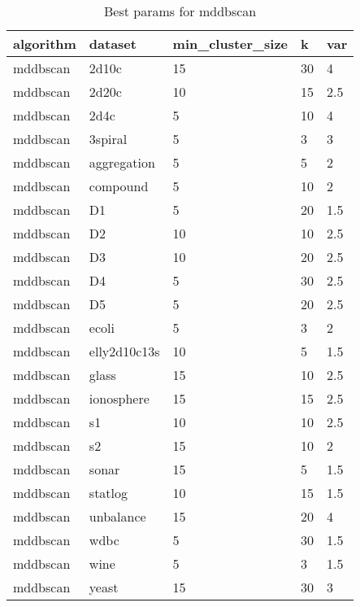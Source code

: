 \begin{table}[H]
\centering
\caption{Best params for mddbscan}
\label{tab:params:mddbscan}
\begin{tabular}{|l|l|l|l|l|}
\hline
algorithm & dataset & min\_cluster\_size & k & var \\
\hline
mddbscan & 2d10c & 15 & 30 & 4 \\
\hline
mddbscan & 2d20c & 10 & 15 & 2.5 \\
\hline
mddbscan & 2d4c & 5 & 10 & 4 \\
\hline
mddbscan & 3spiral & 5 & 3 & 3 \\
\hline
mddbscan & aggregation & 5 & 5 & 2 \\
\hline
mddbscan & compound & 5 & 10 & 2 \\
\hline
mddbscan & D1 & 5 & 20 & 1.5 \\
\hline
mddbscan & D2 & 10 & 10 & 2.5 \\
\hline
mddbscan & D3 & 10 & 20 & 2.5 \\
\hline
mddbscan & D4 & 5 & 30 & 2.5 \\
\hline
mddbscan & D5 & 5 & 20 & 2.5 \\
\hline
mddbscan & ecoli & 5 & 3 & 2 \\
\hline
mddbscan & elly2d10c13s & 10 & 5 & 1.5 \\
\hline
mddbscan & glass & 15 & 10 & 2.5 \\
\hline
mddbscan & ionosphere & 15 & 15 & 2.5 \\
\hline
mddbscan & s1 & 10 & 10 & 2.5 \\
\hline
mddbscan & s2 & 15 & 10 & 2 \\
\hline
mddbscan & sonar & 15 & 5 & 1.5 \\
\hline
mddbscan & statlog & 10 & 15 & 1.5 \\
\hline
mddbscan & unbalance & 15 & 20 & 4 \\
\hline
mddbscan & wdbc & 5 & 30 & 1.5 \\
\hline
mddbscan & wine & 5 & 3 & 1.5 \\
\hline
mddbscan & yeast & 15 & 30 & 3 \\
\hline
\end{tabular}
\end{table}